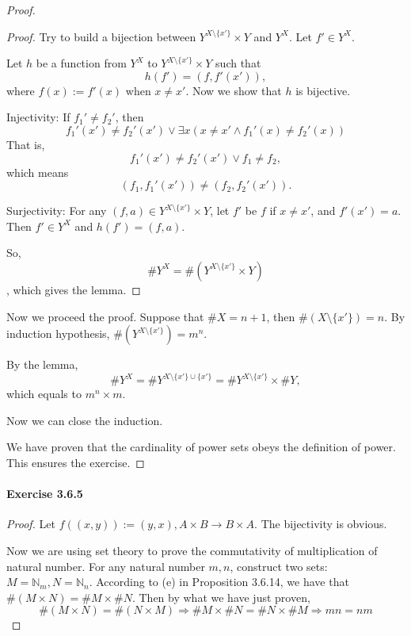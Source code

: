 \begin{proof}
\begin{proof}
Try to build a bijection between $Y^{X\setminus\{x'\}} \times Y$ and $Y^X$. Let $f' \in Y^X$.

Let $h$ be a function from $Y^X$ to $Y^{X\setminus\{x'\}} \times Y$ such that
\[
h(f') = (f,f'(x')), 
\]
where $f(x):=f'(x)$ when $x \neq x'$. Now we show that $h$ is bijective.

Injectivity: 
If ${f_1}' \neq {f_2}'$, then 
\[
{f_1}'(x') \neq {f_2}'(x') \vee \exists x(x \neq x' \wedge {f_1}'(x) \neq {f_2}'(x))
\]
That is, 
\[
{f_1}'(x') \neq {f_2}'(x') \vee f_1 \neq f_2,
\]
which means 
\[
(f_1,{f_1}'(x')) \neq (f_2,{f_2}'(x')).
\]

Surjectivity:
For any $(f,a) \in Y^{X\setminus\{x'\}} \times Y$, let $f'$ be $f$ if $x\neq x'$, and $f'(x') = a$. Then 
$f' \in Y^X$ and $h(f') = (f,a)$.

So, 
\[
\#Y^X = \#(Y^{X\setminus\{x'\}} \times Y)
\], which gives the lemma.
\end{proof}

Now we proceed the proof. Suppose that $\#X = n+1$, then $\#(X \setminus\{x'\}) = n$. By induction 
hypothesis, $\#(Y^{X \setminus\{x'\}}) = m^n$. 

By the lemma, 
\[
\#Y^X = \#Y^{X\setminus\{x'\}\cup\{x'\}} = \#Y^{X\setminus\{x'\}} \times \#Y,
\]
which equals to $m^n \times m$.

Now we can close the induction.

We have proven that the cardinality of power sets obeys the definition of power. This ensures the 
exercise.
\end{proof}

\paragraph{Exercise 3.6.5} \label{exercise3.6.5}
\begin{proof}
Let $f((x,y)):= (y,x), A\times B \rightarrow B \times A$. The bijectivity is obvious. 

Now we are using set theory to prove the commutativity of multiplication of natural number. For any 
natural number $m,n$, construct two sets: $M = \mathbb{N}_{m}, N = \mathbb{N}_{n}$. According to (e) in 
Proposition 3.6.14, we have that $\#(M \times N) = \#M \times \#N$. Then by what we have just proven, 
\[
\#(M \times N) = \#(N \times M) \Longrightarrow \#M \times \#N = \#N \times \#M \Longrightarrow mn = nm
\]
\end{proof}

